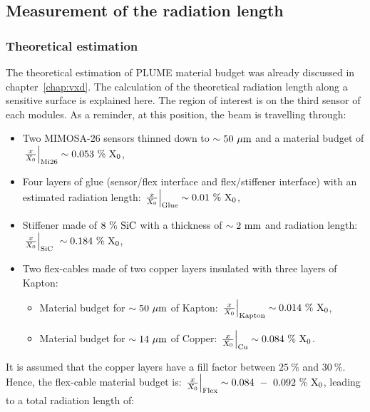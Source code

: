    \subsection{Measurement of the radiation length}

     \subsubsection{Theoretical estimation}

     The theoretical estimation of \gls{PLUME} material budget was already discussed in chapter~\ref{chap:vxd}.
     The calculation of the theoretical radiation length along a sensitive surface is explained here.
     The region of interest is on the third sensor of each modules. 
     As a reminder, at this position, the beam is travelling through:
     
     \begin{itemize}
       \item Two \gls{MIMOSA}-26 sensors thinned down to $\sim 50~\rm{\mu m}$ and a material budget of $\left. \frac{x}{X_0} \right|_{\rm{Mi26}} \sim 0.053~\%~\rm{X_{0}}$,
       \item Four layers of glue (sensor/flex interface and flex/stiffener interface) with an estimated radiation length: $\left. \frac{x}{X_0} \right|_{\rm{Glue}} \sim 0.01~\%~\rm{X_0}$,
       \item Stiffener made of $8~\%~\rm{SiC}$ with a thickness of $\sim 2~\rm{mm}$ and radiation length: $\left. \frac{x}{X_0} \right|_{\rm{SiC}} ~\sim 0.184~\%~\rm{X_{0}}$,
       \item Two flex-cables made of two copper layers insulated with three layers of Kapton:
       \begin{itemize}
         \item Material budget for $\sim 50~\rm{\mu m}$ of Kapton: $\left. \frac{x}{X_0} \right|_{\rm{Kapton}} \sim 0.014~\%~\rm{X_{0}}$,
         \item Material budget for $\sim 14~\rm{\mu m}$ of Copper: $\left. \frac{x}{X_0} \right|_{\rm{Cu}} \sim 0.084~\%~\rm{X_{0}}$.
       \end{itemize}
     \end{itemize}

     It is assumed that the copper layers have a fill factor between $25~\%$ and $30~\%$.
     Hence, the flex-cable material budget is: $\left. \frac{x}{X_0} \right|_{\rm{Flex}} \sim 0.084~-~0.092~\%~\rm{X_0}$, leading to a total radiation length of:

